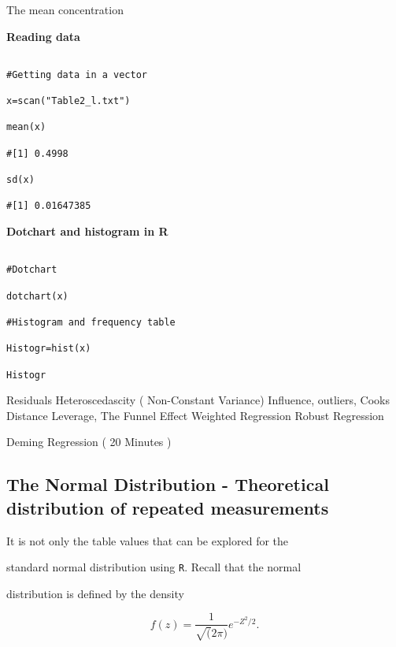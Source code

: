 The mean concentration

 

\noindent \textbf{Reading data}\\

\begin{verbatim}

#Getting data in a vector

x=scan("Table2_l.txt")

mean(x)

#[1] 0.4998

sd(x)

#[1] 0.01647385

\end{verbatim}

 

\textbf{Dotchart and histogram in R}\\

\begin{verbatim}

#Dotchart

dotchart(x)

#Histogram and frequency table

Histogr=hist(x)

Histogr

\end{verbatim}

 



Residuals
Heteroscedascity ( Non-Constant Variance)
Influence, outliers, Cooks Distance Leverage,
The Funnel Effect
Weighted Regression
Robust Regression

Deming Regression ( 20 Minutes )


\subsection{The Normal Distribution - Theoretical distribution of repeated measurements}

 

It is not only the table values that can be explored for the

standard normal distribution using \texttt{R}. Recall that the normal

distribution is defined by the density

 

\[

f(z) = \frac{1}{\sqrt(2 \pi)}e^{-Z^2/2}.

\]

